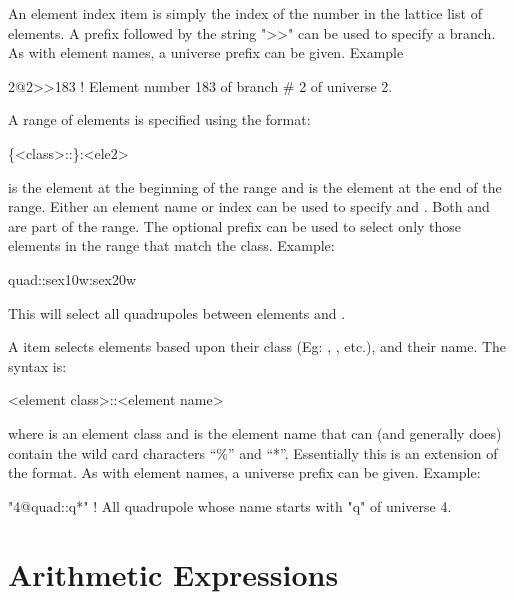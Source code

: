 An element index item is simply the index of the number in the lattice
list of elements. A prefix followed by the string ">>" can be used to
specify a branch. As with element names, a universe prefix can be 
given. Example
\begin{example}
  2@2>>183   ! Element number 183 of branch \# 2 of universe 2.
\end{example}

A range of elements is specified using the format:
\begin{example}
  \{<class>::\}<ele1>:<ele2>
\end{example}
 is the element at the beginning of the range and
 is the element at the end of the range. Either an element
name or index can be used to specify  and . Both
 and  are part of the range. The optional  
prefix can be used to select only those elements in the range that match the class.
Example:
\begin{example}
  quad::sex10w:sex20w
\end{example}
This will select all quadrupoles between elements  and .

A  item
selects elements based upon their class (Eg: ,
, etc.), and their name. The syntax is:
\begin{example}
  <element class>::<element name>
\end{example}
where  is an element class and  is the element name that can (and generally does) contain the wild card characters
``\%'' and ``*''. Essentially this is an extension of the 
format. As with element names, a universe prefix can be 
given. Example:
\begin{example}
  "4@quad::q*"   ! All quadrupole whose name starts with "q" of universe 4.
\end{example}

\section{Arithmetic Expressions}
\label{s:arithmetic.exp}

